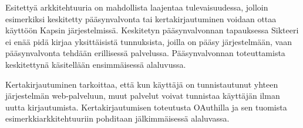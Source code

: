 Esitettyä arkkitehtuuria on mahdollista laajentaa tulevaisuudessa, jolloin esimerkiksi keskitetty pääsynvalvonta tai kertakirjautuminen voidaan ottaa käyttöön Kapsin järjestelmissä. Keskitetyn pääsynvalvonnan tapauksessa Sikteeri ei enää pidä kirjaa yksittäisistä tunnuksista, joilla on pääsy järjestelmään, vaan pääsynvalvonta tehdään erillisessä palvelussa. Pääsynvalvonnan toteuttamista keskitettynä käsitellään ensimmäisessä alaluvussa.

Kertakirjautuminen tarkoittaa, että kun käyttäjä on tunnistautunut yhteen järjestelmän web-palveluun, muut palvelut voivat tunnistaa käyttäjän ilman uutta kirjautumista. Kertakirjautumisen toteutusta OAuthilla ja sen tuomista esimerkkiarkkitehtuuriin pohditaan jälkimmäisessä alaluvassa.